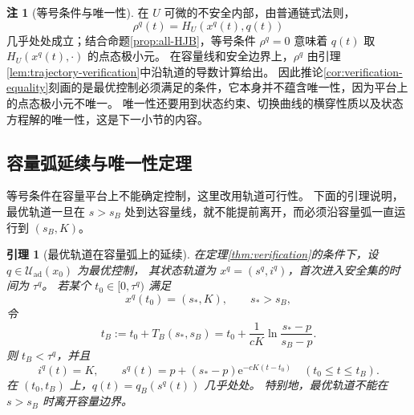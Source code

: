 \documentclass[11pt,a4paper,UTF8]{ctexart}
\newtheorem{lemma}[theorem]{引理}
\theoremstyle{definition}
\newtheorem{remark}[theorem]{注}
\newcommand{\Uad}{\mathcal U_{\mathrm{ad}}}
\newcommand{\e}{\mathrm e}
\begin{document}
\begin{remark}[等号条件与唯一性]
\label{rem:verification-equality-uniqueness}
在 $U$ 可微的不安全内部，由普通链式法则，
\[
\rho^q(t)=H_U(x^q(t),q(t))
\]
几乎处处成立；结合命题\ref{prop:all-HJB}，等号条件 $\rho^q=0$ 意味着 $q(t)$ 取 $H_U(x^q(t),\cdot)$ 的点态极小元。
在容量线和安全边界上，$\rho^q$ 由引理\ref{lem:trajectory-verification}中沿轨道的导数计算给出。
因此推论\ref{cor:verification-equality}刻画的是最优控制必须满足的条件，它本身并不蕴含唯一性，因为平台上的点态极小元不唯一。
唯一性还要用到状态约束、切换曲线的横穿性质以及状态方程解的唯一性，这是下一小节的内容。
\end{remark}


\subsection{容量弧延续与唯一性定理}
\label{sec:constant-uniqueness}
等号条件在容量平台上不能确定控制，这里改用轨道可行性。
下面的引理说明，最优轨道一旦在 $s>s_B$ 处到达容量线，就不能提前离开，而必须沿容量弧一直运行到 $(s_B,K)$。

\begin{lemma}[最优轨道在容量弧上的延续]
\label{lem:no-early-boundary-exit}
在定理\ref{thm:verification}的条件下，设 $q\in\Uad(x_0)$ 为最优控制，
其状态轨道为 $x^q=(s^q,i^q)$，首次进入安全集的时间为 $\tau^q$。
若某个 $t_0\in[0,\tau^q)$ 满足
\[
x^q(t_0)=(s_*,K),\qquad s_*>s_B,
\]
令
\[
t_B:=t_0+T_B(s_*,s_B)
=t_0+\frac1{cK}\ln\frac{s_*-p}{s_B-p}.
\]
则 $t_B<\tau^q$，并且
\begin{equation}
i^q(t)=K,\qquad
s^q(t)=p+(s_*-p)\e^{-cK(t-t_0)}
\quad(t_0\le t\le t_B).
\label{eq:optimal-boundary-continuation}
\end{equation}
在 $(t_0,t_B)$ 上，$q(t)=q_B(s^q(t))$ 几乎处处。
特别地，最优轨道不能在 $s>s_B$ 时离开容量边界。
\end{lemma}
\end{document}
